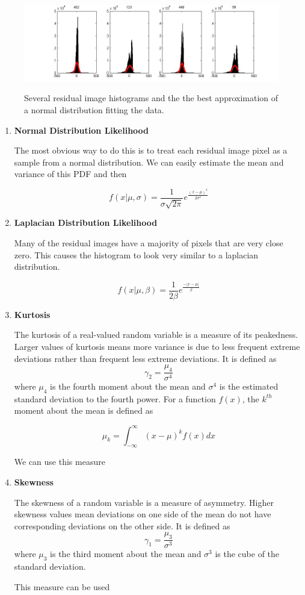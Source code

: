 \begin{figure}
	\centering
		\includegraphics[width=1\textwidth]{figures/severalHists.jpg}
	\label{fig:severalHists}
	
		\caption[Several residual image histograms.]{Several residual image histograms and the the best approximation of a normal distribution fitting the data.}
\end{figure}

\begin{enumerate}
\item{\textbf{Normal Distribution Likelihood}}

The most obvious way to do this is to treat each residual image pixel as a sample from a normal distribution.  We can easily estimate the mean and variance of this PDF and then 

$$f(x|\mu,\sigma)=\frac{1}{\sigma\sqrt{2\pi}}e^{\frac{(x-\mu)^2}{2\sigma^2}}$$


\item{\textbf{Laplacian Distribution Likelihood}}

Many of the residual images have a majority of pixels that are very close zero.  This causes the histogram to look very similar to a laplacian distribution.

$$f(x|\mu,\beta)=\frac{1}{2\beta}e^{\frac{-|x-\mu|}{\beta}}$$

\item{\textbf{Kurtosis}}

The kurtosis of a real-valued random variable is a measure of its peakedness.  Larger values of kurtosis means more variance is due to less frequent extreme deviations rather than frequent less extreme deviations.  It is defined as $$\gamma_2=\frac{\mu_4}{\sigma^4}$$ where $\mu_4$ is the fourth moment about the mean and $\sigma^4$ is the estimated standard deviation to the fourth power.  For a function $f(x)$, the $k^{th}$ moment about the mean is defined as 

$$\mu_k = \int_{-\infty}^{\infty}{(x-\mu)^kf(x)dx}$$

We can use this measure 

\item{\textbf{Skewness}}

The skewness of a random variable is a measure of asymmetry.  Higher skewness values mean deviations on one side of the mean do not have corresponding deviations on the other side.  It is defined as $$\gamma_1=\frac{\mu_3}{\sigma^3}$$ where $\mu_3$ is the third moment about the mean and $\sigma^3$ is the cube of the standard deviation.

This measure can be used


\end{enumerate}


